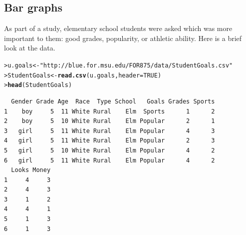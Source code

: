 \documentclass[12pt,oneside]{book}\usepackage[]{graphicx}\usepackage[]{color}
\makeatletter
\newcommand{\hlnum}[1]{\textcolor[rgb]{0.686,0.059,0.569}{#1}}%
\newcommand{\hlstr}[1]{\textcolor[rgb]{0.192,0.494,0.8}{#1}}%
\newcommand{\hlstd}[1]{\textcolor[rgb]{0.345,0.345,0.345}{#1}}%
\newcommand{\hlkwb}[1]{\textcolor[rgb]{0.69,0.353,0.396}{#1}}%
\newcommand{\hlkwc}[1]{\textcolor[rgb]{0.333,0.667,0.333}{#1}}%
\newcommand{\hlkwd}[1]{\textcolor[rgb]{0.737,0.353,0.396}{\textbf{#1}}}%
\newenvironment{kframe}{%
 \def\at@end@of@kframe{}%
 \ifinner\ifhmode%
  \def\at@end@of@kframe{\end{minipage}}%
  \begin{minipage}{\columnwidth}%
 \fi\fi%
 \def\FrameCommand##1{\hskip\@totalleftmargin \hskip-\fboxsep
 \colorbox{shadecolor}{##1}\hskip-\fboxsep
     \hskip-\linewidth \hskip-\@totalleftmargin \hskip\columnwidth}%
 \MakeFramed {\advance\hsize-\width
   \@totalleftmargin\z@ \linewidth\hsize
   \@setminipage}}%
 {\par\unskip\endMakeFramed%
 \at@end@of@kframe}
\newenvironment{knitrout}{}{} %
\makeatother
\begin{document}
\subsection{Bar graphs}
As part of a study, elementary school students were asked which was more important to them: good grades, popularity, or athletic ability. Here is a brief look at the data.
\begin{knitrout}
\color{fgcolor}\begin{kframe}
\begin{alltt}
\hlstd{> }\hlstd{u.goals} \hlkwb{<-} \hlstr{"http://blue.for.msu.edu/FOR875/data/StudentGoals.csv"}
\hlstd{> }\hlstd{StudentGoals} \hlkwb{<-} \hlkwd{read.csv}\hlstd{(u.goals,} \hlkwc{header} \hlstd{=} \hlnum{TRUE}\hlstd{)}
\hlstd{> }\hlkwd{head}\hlstd{(StudentGoals)}
\end{alltt}
\begin{verbatim}
  Gender Grade Age  Race  Type School   Goals Grades Sports
1    boy     5  11 White Rural    Elm  Sports      1      2
2    boy     5  10 White Rural    Elm Popular      2      1
3   girl     5  11 White Rural    Elm Popular      4      3
4   girl     5  11 White Rural    Elm Popular      2      3
5   girl     5  10 White Rural    Elm Popular      4      2
6   girl     5  11 White Rural    Elm Popular      4      2
  Looks Money
1     4     3
2     4     3
3     1     2
4     4     1
5     1     3
6     1     3
\end{verbatim}
\end{kframe}
\end{knitrout}
\end{document}
